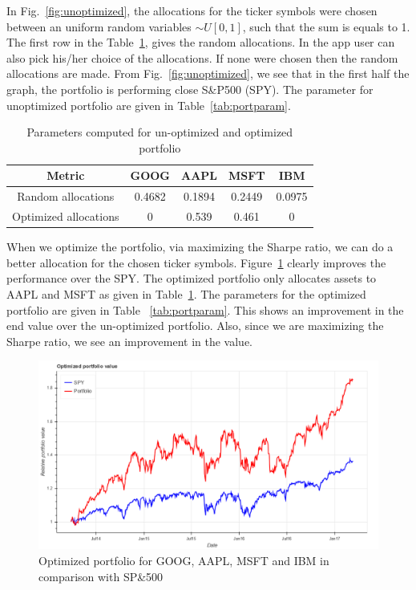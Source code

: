 \documentclass[12pt]{article}
\begin{document}
\begin{itemize}
In Fig.~\ref{fig:unoptimized}, the allocations for the ticker symbols were chosen between an uniform random variables $\sim U[0,1]$, such that the sum is equals to 1. The first row in the Table~\ref{tab:alloc}, gives the random allocations. In the app  \href{http://quantfy.herokuapp.com/portfolio}{\color{blue}{http://quantfy.herokuapp.com/portfolio}} user can also pick his/her choice of the allocations. If none were chosen then the random allocations are made. From Fig.~\ref{fig:unoptimized}, we see that in the first half the graph, the portfolio is performing close S\&P500 (SPY). The parameter for unoptimized portfolio are given in Table~\ref{tab:portparam}.

\begin{table}
\begin{center}
\begin{tabular} {|c|c|c|c|c|}
\hline \hline
\textbf{Metric} & \textbf{GOOG} & \textbf{AAPL} & \textbf{MSFT} & \textbf{IBM} \\ \hline
Random allocations & 0.4682 & 0.1894 &0.2449 &0.0975 \\ \hline
Optimized allocations & 0 & 0.539 & 0.461 & 0 \\ \hline
\hline
\end{tabular}
\end{center}
\caption{Parameters computed for un-optimized and optimized portfolio}
\label{tab:alloc}
\end{table}

When we optimize the portfolio, via maximizing the Sharpe ratio, we can do a better allocation for the chosen ticker symbols.  Figure~\ref{fig:optimized} clearly improves the performance over the SPY. The optimized portfolio only allocates assets to AAPL and MSFT as given in Table~\ref{tab:alloc}. The parameters for the optimized portfolio are given in Table ~\ref{tab:portparam}. This shows an improvement in the end value over the un-optimized portfolio. Also, since we are maximizing the Sharpe ratio, we see an improvement in the value.

\begin{figure}[!htbp]
\begin{center}
\includegraphics[height=0.5\textheight,width=\textwidth]{optimized.png}
\caption{Optimized portfolio for GOOG, AAPL, MSFT and IBM in comparison with SP\&500}
\label{fig:optimized}
\end{center}
\end{figure}



\end{itemize}
\end{document}
